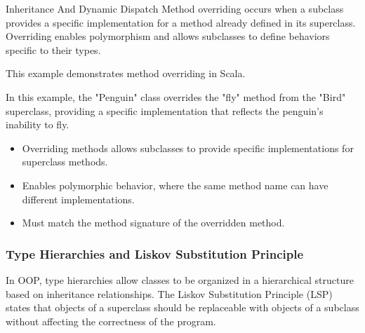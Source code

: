 \begin{notes}{Inheritance And Dynamic Dispatch}
    Method overriding occurs when a subclass provides a specific implementation for a method already defined in its superclass. Overriding enables polymorphism and allows subclasses to define behaviors specific to their types.
    
    \begin{highlight}
    
        This example demonstrates method overriding in Scala.
    
    
        In this example, the "Penguin" class overrides the "fly" method from the "Bird" superclass, providing a specific implementation that reflects the penguin's inability to fly.
    
        \begin{itemize}
            \item Overriding methods allows subclasses to provide specific implementations for superclass methods.
            \item Enables polymorphic behavior, where the same method name can have different implementations.
            \item Must match the method signature of the overridden method.
        \end{itemize}
    
    \end{highlight}
    
    \subsubsection*{Type Hierarchies and Liskov Substitution Principle}
    
    In OOP, type hierarchies allow classes to be organized in a hierarchical structure based on inheritance relationships. The Liskov Substitution Principle (LSP) states that objects of a superclass should be replaceable with objects of a subclass without affecting the correctness of the program.
    

\end{notes}
